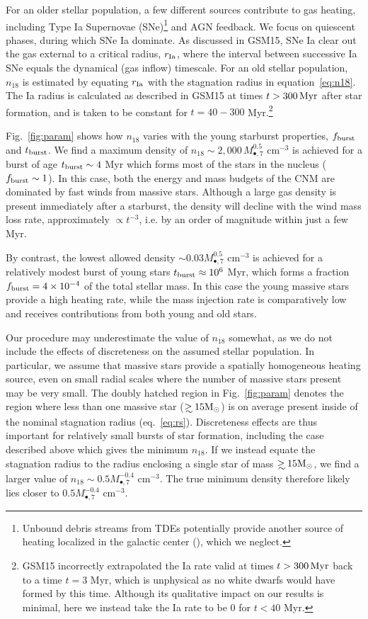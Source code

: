 \documentclass[usenatbib,fleqn]{mnras}
\newcommand\gsim{\mathrel{\rlap{\lower4pt\hbox{\hskip1pt$\sim$}}
    \raise1pt\hbox{$>$}}}
\newcommand{\Mbh}[1][]{M_{\bullet#1}}
\newcommand{\Msun}{{\rm M_\odot}}
\begin{document}
For an older stellar population, a few different sources contribute to
gas heating, including Type Ia Supernovae (SNe)\footnote{Unbound
  debris streams from TDEs potentially provide another source of
  heating localized in the galactic center
  (\citealt{Guillochon+2015a}), which we neglect.} and AGN feedback.
We focus on quiescent phases, during which SNe Ia dominate.  As
discussed in GSM15, SNe Ia clear out the gas external to a critical
radius, $r_{\rm Ia}$, where the interval between successive Ia SNe
equals the dynamical (gas inflow) timescale.  For an old stellar
population, $n_{18}$ is estimated by equating $r_{\rm Ia}$ with the
stagnation radius in equation~\eqref{eq:n18}.  The Ia radius is
calculated as described in GSM15 at times $t>300 \,{\rm Myr}$ after
star formation, and is taken to be constant for $t = 40-300$
Myr.\footnote{GSM15 incorrectly extrapolated the Ia rate valid at
  times $t>300 \,{\rm Myr}$ back to a time $t = 3$ Myr, which is
  unphysical as no white dwarfs would have formed by this time.
  Although its qualitative impact on our results is minimal, here we
  instead take the Ia rate to be 0 for $ t < 40$ Myr.}


Fig.~\ref{fig:param} shows how $n_{18}$ varies with the young
starburst properties, $f_{\rm burst}$ and $t_{\rm burst}$.  We find a
maximum density of $n_{18} \sim 2,000\, \Mbh[,7]^{0.5}$ cm$^{-3}$ is
achieved for a burst of age $t_{\rm burst} \sim 4$ Myr which forms
most of the stars in the nucleus ($f_{\rm burst} \sim 1$).  In this
case, both the energy and mass budgets of the CNM are dominated by
fast winds from massive stars.  Although a large gas density is
present immediately after a starburst, the density will decline with
the wind mass loss rate, approximately $\propto t^{-3}$, i.e. by an
order of magnitude within just a few Myr.


By contrast, the lowest allowed density $\sim 0.03 \Mbh[,7]^{0.5}$
cm$^{-3}$ is achieved for a relatively modest burst of young stars
$t_{\rm burst} \approx 10^{6}$ Myr, which forms a fraction $f_{\rm
  burst} = 4\times 10^{-4}$ of the total stellar mass. In this case
the young massive stars provide a high heating rate, while the mass
injection rate is comparatively low and receives contributions from
both young and old stars.

Our procedure may underestimate the value of $n_{18}$ somewhat, as we
do not include the effects of discreteness on the assumed stellar
population.  In particular, we assume that massive stars provide a
spatially homogeneous heating source, even on small radial scales
where the number of massive stars present may be very small.  The
doubly hatched region in Fig.~\ref{fig:param} denotes the region where
less than one massive star ($\gsim 15 \Msun$) is on average present
inside of the nominal stagnation radius (eq.~\ref{eq:rs}).
Discreteness effects are thus important for relatively small bursts of
star formation, including the case described above which gives the
minimum $n_{18}$.  If we instead equate the stagnation radius to the
radius enclosing a single star of mass $\gsim 15 \Msun$, we find a
larger value of $n_{18}\sim 0.5 \Mbh[,7]^{-0.4}$ cm$^{-3}$.  The true
minimum density therefore likely lies closer to $0.5 \Mbh[,7]^{-0.4}$
cm$^{-3}$.
\end{document}

